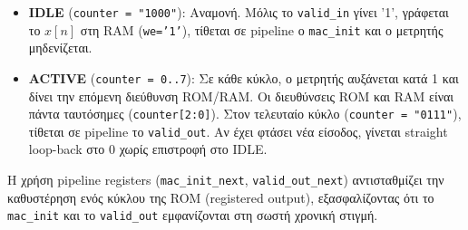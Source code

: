\documentclass[12pt]{article}
\begin{document}
\begin{itemize}
    \item \textbf{IDLE} (\texttt{counter = "1000"}): Αναμονή. Μόλις το \texttt{valid\_in} γίνει '1', γράφεται το $x[n]$ στη RAM (\texttt{we='1'}), τίθεται σε pipeline ο \texttt{mac\_init} και ο μετρητής μηδενίζεται.
    \item \textbf{ACTIVE} (\texttt{counter = 0..7}): Σε κάθε κύκλο, ο μετρητής αυξάνεται κατά 1 και δίνει την επόμενη διεύθυνση ROM/RAM. Οι διευθύνσεις ROM και RAM είναι πάντα ταυτόσημες (\texttt{counter[2:0]}). Στον τελευταίο κύκλο (\texttt{counter = "0111"}), τίθεται σε pipeline το \texttt{valid\_out}. Αν έχει φτάσει νέα είσοδος, γίνεται straight loop-back στο 0 χωρίς επιστροφή στο IDLE.
\end{itemize}

Η χρήση pipeline registers (\texttt{mac\_init\_next}, \texttt{valid\_out\_next}) αντισταθμίζει την καθυστέρηση ενός κύκλου της ROM (registered output), εξασφαλίζοντας ότι το \texttt{mac\_init} και το \texttt{valid\_out} εμφανίζονται στη σωστή χρονική στιγμή.
\end{document}
